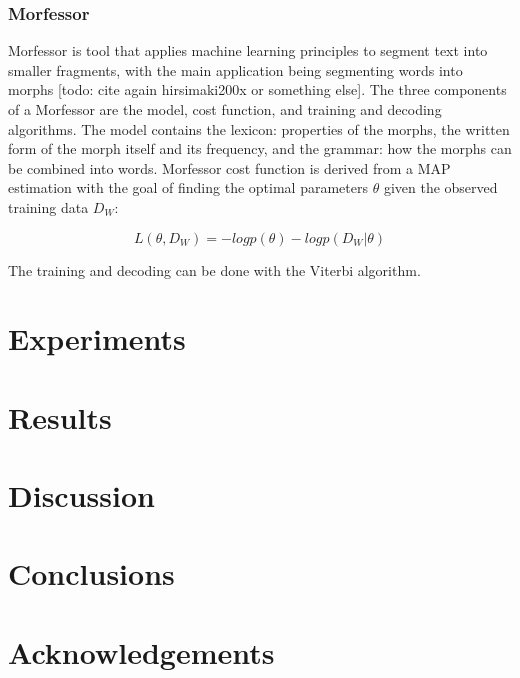 \documentclass[10pt,b5paper]{article}
\begin{document}
\subsubsection{Morfessor}

Morfessor is tool that applies machine learning principles to segment text into smaller fragments, with the main application being segmenting words into morphs [todo: cite again hirsimaki200x or something else]. The three components of a Morfessor are the model, cost function, and training and decoding algorithms. The model contains the lexicon: properties of the morphs, the written form of the morph itself and its frequency, and the grammar: how the morphs can be combined into words. Morfessor cost function is derived from a MAP estimation with the goal of finding the optimal parameters $\theta$ given the observed training data $D_W$:

\begin{equation}
L(\theta, D_W)=-log p(\theta)-log p(D_W|\theta)
\end{equation}

The training and decoding can be done with the Viterbi algorithm.

\section{Experiments} 

\section{Results}

\section{Discussion}

\section{Conclusions} 

\section{Acknowledgements} 


 
\end{document}
